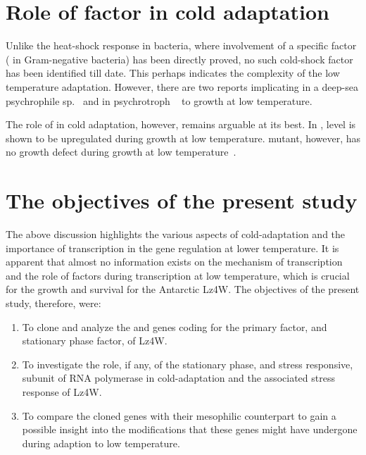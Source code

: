 \section{Role of \s{} factor in cold adaptation}

Unlike the heat-shock response in bacteria, where involvement of a
specific \s{} factor (\s{} in Gram-negative bacteria) has been
directly proved, no such cold-shock \s{} factor has been
identified till date. This perhaps indicates the complexity of the
low temperature adaptation. However, there are two reports
implicating \s{} in a deep-sea psychrophile 
sp.~\citep{Chi1995} and  in psychrotroph ~\citep{Becker2000} to growth at low temperature.

The role of  in cold adaptation, however, remains arguable
at its best. In , \sigs{} level is shown to be
upregulated during growth at low temperature.  mutant,
however, has no growth defect during growth at low
temperature~\citep{Sledjeski1996}.

\section{The objectives of the present study}
The above discussion highlights the various aspects of
cold-adaptation and the importance of transcription in the gene
regulation at lower temperature. It is apparent that almost no
information exists on the mechanism of transcription and the role
of \s{} factors during transcription at low temperature, which is
crucial for the growth and survival for the Antarctic  Lz4W. The objectives of the present study, therefore,
were:

\begin{enumerate}

\item To clone and analyze the  and  genes coding
for the primary \s{} factor, \s{} and stationary phase \s{}
factor, \sigs{} of  Lz4W.

\item To investigate the role, if any, of the stationary phase,
and stress responsive, \sigs{} subunit of RNA polymerase in
cold-adaptation and the associated stress response of  Lz4W.

\item To compare the cloned \s{} genes with their mesophilic
counterpart to gain a possible insight into the modifications that
these genes might have undergone during adaption to low
temperature.

\end{enumerate}
